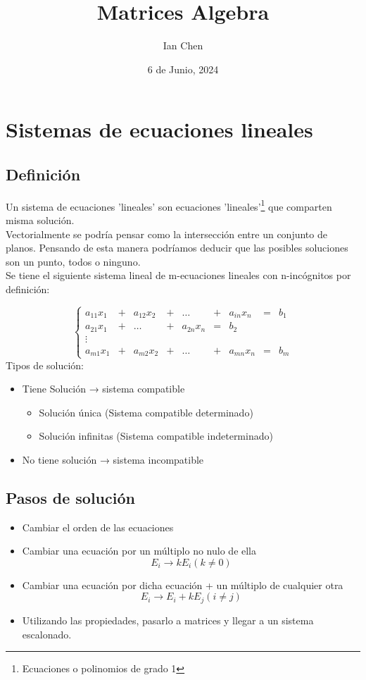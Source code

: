 \documentclass{article}
\title{Matrices Algebra}
\author{Ian Chen}
\date{6 de Junio, 2024}
\begin{document}
\maketitle

\section{Sistemas de ecuaciones lineales}
\subsection{Definición}
Un sistema de ecuaciones 'lineales' son ecuaciones 'lineales'\footnote{Ecuaciones o polinomios de grado 1} que comparten misma solución. \\[6pt]
Vectorialmente se podría pensar como la intersección entre un conjunto de planos. Pensando de esta manera podríamos deducir que las posibles soluciones son un punto, todos o ninguno.\\[6pt]
Se tiene el siguiente sistema lineal de m-ecuaciones lineales con n-incógnitos por definición:

\[\left\{
\begin{array}{ccccccccc}
    a_{11}x_1 & + & a_{12}x_2 & + & \dots & + & a_{in}x_n & = & b_1 \\
    a_{21}x_1 & + & \dots & + & a_{2n}x_n & = & b_2 \\
    \vdots \\
    a_{m1}x_1 & + & a_{m2}x_2 & + & \dots & + & a_{mn}x_n & = & b_m
\end{array}
\right.
\]
\noindent
Tipos de solución:
\begin{itemize}
    \item Tiene Solución → sistema compatible
    \begin{itemize}
        \item Solución única (Sistema compatible determinado)
        \item Solución infinitas (Sistema compatible indeterminado)
    \end{itemize}
    \item No tiene solución → sistema incompatible
\end{itemize}

\subsection{Pasos de solución}
\begin{itemize}
    \item Cambiar el orden de las ecuaciones
    \item Cambiar una ecuación por un múltiplo no nulo de ella
        $$E_i \rightarrow kE_i (k \neq 0)$$
    \item Cambiar una ecuación por dicha ecuación + un múltiplo de cualquier otra 
        $$E_i \rightarrow E_i + kE_j (i \neq j)$$
    \item Utilizando las propiedades, pasarlo a matrices y llegar a un sistema escalonado.
\end{itemize}
\end{document}
